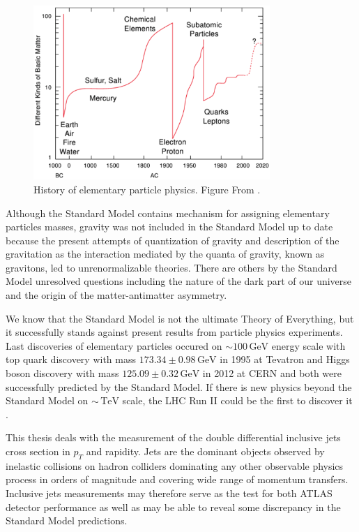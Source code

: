 \documentclass[a4paper,11pt,twoside,openright]{book}
\newcommand{\TeV}{\,\text{TeV}}
\newcommand{\GeV}{\,\text{GeV}}
\newcommand{\pt}{p_{T}}
\begin{document}
\begin{figure}[t]
  \centering
  \includegraphics[width=0.8\textwidth]{Introduction/HistoryOfElementaryParticlePhysics.png}
  \caption{History of elementary particle physics. Figure From
    \cite{LatticeQCDForPedestrians}.}
  \label{fig:HistoryOfElPartPhysics}
\end{figure}

Although the Standard Model contains mechanism for assigning elementary particles
masses, gravity was not included in the Standard Model up to date because the
present attempts of quantization of gravity and description of the gravitation as the
interaction mediated by the quanta of gravity, known as gravitons, led to 
unrenormalizable theories. There are others by the Standard Model unresolved
questions including the nature of the dark part of our universe and the origin
of the matter-antimatter asymmetry. 

We know that the Standard Model is not the ultimate Theory of Everything,
but it successfully stands against present results from particle physics
experiments. Last
discoveries of elementary particles occured on $\sim 100\GeV$ energy scale with top
quark discovery \cite{TopQuark1,TopQuark2} with mass $173.34 \pm 0.98 \GeV$ in
1995 at Tevatron and Higgs boson discovery \cite{HiggsDiscovery} with mass
$125.09 \pm 0.32 \GeV$ in 2012 at CERN and both were successfully predicted by
the Standard Model. If there is new physics beyond the Standard Model on $\sim
\TeV$ scale, the LHC Run II could be the first to discover it
\cite{PhysicsAtRun2LHC}. 

This thesis deals with the measurement of the double differential inclusive jets 
cross section in $\pt$ and rapidity. Jets are the dominant objects
observed by inelastic collisions on hadron colliders dominating any other observable physics process in
orders of magnitude and covering wide range of momentum transfers. Inclusive
jets measurements may therefore serve as the test for both ATLAS detector
performance as well as may
be able to reveal some discrepancy in the Standard Model predictions.
\end{document}
